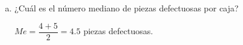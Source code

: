 \documentclass[]{article}
\begin{document}
\begin{enumerate}[{Ejercicio} 1.]
\begin{center}
\begin{enumerate} [a)]
				5 y 6 piezas defectuosas (distribución bimodal).
				
				\item ¿Cuál es el número mediano de piezas defectuosas por caja? \newline
				
				$Me = \dfrac{4+5}{2} = 4.5$ piezas defectuosas.
			\end{enumerate}
		\end{center}
		
		
	\end{enumerate}
	
\end{document}
